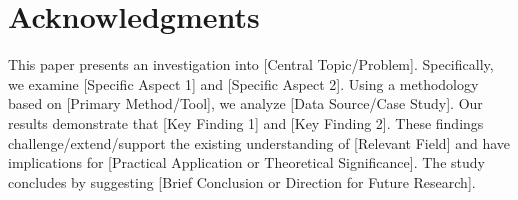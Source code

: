 \chapter*{Acknowledgments}

This paper presents an investigation into [Central Topic/Problem]. Specifically, we examine [Specific Aspect 1] and [Specific Aspect 2]. Using a methodology based on [Primary Method/Tool], we analyze [Data Source/Case Study]. Our results demonstrate that [Key Finding 1] and [Key Finding 2]. These findings challenge/extend/support the existing understanding of [Relevant Field] and have implications for [Practical Application or Theoretical Significance]. The study concludes by suggesting [Brief Conclusion or Direction for Future Research].
